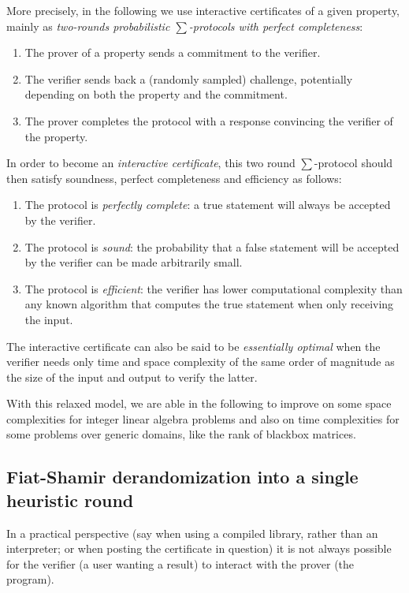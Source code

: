 \documentclass{article}
\begin{document}
More precisely, in the following we use interactive certificates of a given
property, mainly as  {\em two-rounds probabilistic $\sum$-protocols with perfect completeness}: 
\begin{enumerate}
\item The prover of a property sends a commitment to the verifier.
\item The verifier sends back a (randomly sampled) challenge, potentially
  depending on both the property and the commitment.
\item The prover completes the protocol with a response convincing
  the verifier of the property.
\end{enumerate}
In order to become an {\em interactive certificate}, this two round
$\sum$-protocol should then satisfy soundness, perfect completeness and
efficiency as follows: 
\begin{enumerate}\renewcommand {\theenumi}{\roman{enumi}}
\item The protocol is {\em perfectly complete}: a true statement will always be
  accepted by the verifier.
\item The protocol is {\em sound}: the probability that a false statement will
  be accepted by the verifier can be made arbitrarily small.
\item The protocol is {\em efficient}: the verifier has lower computational
  complexity than any known algorithm that computes the true statement when only receiving the input.
\end{enumerate}

The interactive certificate can also be said to be {\em essentially optimal}
when the verifier needs only time and space complexity of the same order of
magnitude as the size of the input and output to verify the latter.

With this relaxed model, we are able in the following to improve on
some space complexities for integer linear algebra problems and also
on time complexities for some problems over generic domains, like the rank of
blackbox matrices.

 
 
 
\subsection{Fiat-Shamir derandomization into a single
  heuristic round}\label{ssec:fiatshamir}
In a practical perspective (say when using a compiled library, rather than an
interpreter; or when posting the certificate in question) it is not always
possible for the verifier (a user wanting a result) to interact with the prover
(the program). 
\end{document}
